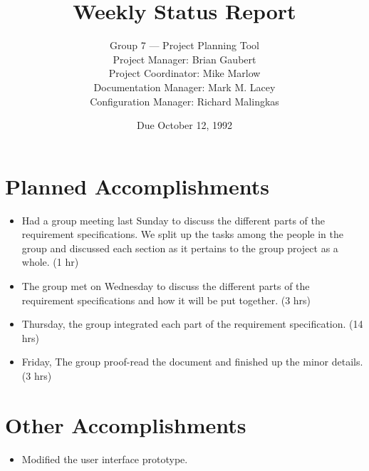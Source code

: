 


\title{Weekly Status Report}

\author{Group 7 --- Project Planning Tool\\
Project Manager: Brian Gaubert\\
Project Coordinator: Mike Marlow\\
Documentation Manager: Mark M. Lacey\\
Configuration Manager: Richard Malingkas}

\date{Due October 12, 1992}

\maketitle

%
%
%
\section{Planned Accomplishments}
\begin{itemize}
	\item Had a group meeting last Sunday to discuss the different
parts of the requirement specifications. We split up the tasks among
the people in the group and discussed each section as it pertains to
the group project as a whole. (1 hr)
	\item The group met on Wednesday to discuss the different
parts of the requirement specifications and how it will be put
together. (3 hrs)
	\item Thursday, the group integrated each part of the
requirement specification. (14 hrs)
	\item Friday, The group proof-read the document and finished
up the minor details. (3 hrs)

\end{itemize}

%
%
%
\section{Other Accomplishments}
\begin{itemize}
	\item Modified the user interface prototype.
\end{itemize}


